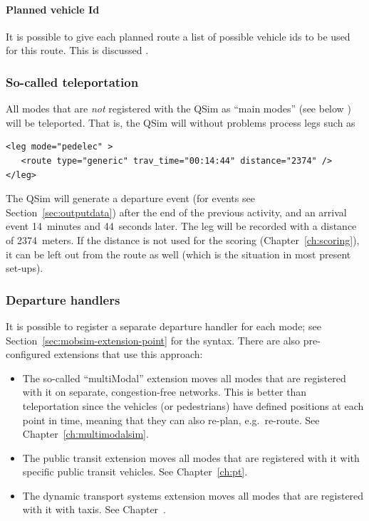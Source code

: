 \paragraph{Planned vehicle Id}

It is possible to give each planned route a list of possible vehicle \glspl{id} to be used for this route.  This is discussed .


\subsubsection{So-called \gls{teleportation}}

All modes that are \emph{not} registered with the QSim as ``main modes'' (see below ) will be teleported.  That is, the QSim will without problems process legs such as
\begin{lstlisting}
<leg mode="pedelec" >
   <route type="generic" trav_time="00:14:44" distance="2374" />
</leg>
\end{lstlisting}
The QSim will generate a departure event (for events see Section~\ref{sec:outputdata}) after the end of the previous activity, and an arrival event 14~minutes and 44~seconds later.  The leg will be recorded with a distance of 2374~meters.  If the distance is not used for the scoring (\cf Chapter~\ref{ch:scoring}), it can be left out from the route as well (which is the situation in most present set-ups).

\subsubsection{Departure handlers}

It is possible to register a separate departure handler for each mode; see Section~\ref{sec:mobsim-extension-point} for the syntax.  There are also pre-configured extensions that use this approach:
\begin{itemize}

\item The so-called ``multiModal'' extension moves all modes that are registered with it on separate, congestion-free networks.  This is better than teleportation since the vehicles (or pedestrians) have defined positions at each point in time, meaning that they can also re-plan, e.g.\ re-route.  See Chapter~\ref{ch:multimodalsim}.

\item The public transit extension moves all modes that are registered with it with specific public transit vehicles.    See Chapter~\ref{ch:pt}.

  \item The dynamic transport systems extension moves all modes that are registered with it with taxis.  See Chapter~\pageref{ch:dts}.

\end{itemize}


